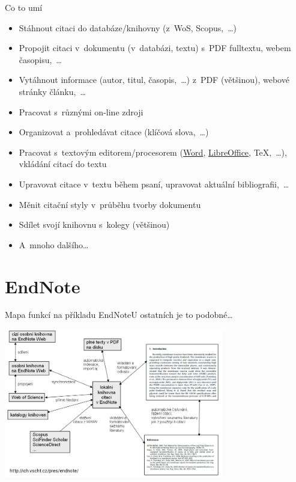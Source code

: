 \documentclass[compress, ucs, xelatex, 11pt, xcolor=svgnames, aspectratio=169,
	hyperref={
		bookmarks=true,
		unicode=true,
		colorlinks=true,
		pdftitle={Citacni software},
		plainpages=false,
		pdfauthor={Vojtech Zeisek},
		pdfsubject={Kratky uvod do citacniho software},
		pdfcreator={XeLaTeX},
		pdfkeywords={citace, reference, software, literatura},
		linkcolor=Crimson, %
		anchorcolor=Magenta, %
		citecolor=Magenta, %
		filecolor=Magenta, %
		menucolor=Magenta, %
		urlcolor=DarkTurquoise, %
		pdftex},
	url={hyphens, lowtilde} %
	]{beamer}
\begin{document}
\begin{frame}{Co to umí}
	\begin{itemize}
		\item Stáhnout citaci do databáze/knihovny (z~WoS, Scopus,~\ldots)
		\item Propojit citaci v~dokumentu (v~databázi, textu) s~PDF fulltextu, webem časopisu,~\ldots
		\item Vytáhnout informace (autor, titul, časopis,~\ldots) z~PDF (většinou), webové stránky článku,~\ldots
		\item Pracovat s~různými on-line zdroji
		\item Organizovat a~prohledávat citace (klíčová slova,~\ldots)
		\item Pracovat s~textovým editorem/procesorem (\href{https://www.natur.cuni.cz/fakulta/cit/podpora-uzivatelu/softwarove-licence}{Word}, \href{https://www.openoffice.cz/}{LibreOffice}, \TeX,~\ldots), vkládání citací do textu
		\item Upravovat citace v~textu během psaní, upravovat aktuální bibliografii,~\ldots
		\item Měnit citační styly v~průběhu tvorby dokumentu
		\item Sdílet svojí knihovnu s~kolegy (většinou)
		\item A~mnoho dalšího\ldots
	\end{itemize}
\end{frame}

\section{EndNote}

\begin{frame}{Mapa funkcí na příkladu EndNote}{U ostatních je to podobné\ldots}
	\begin{center}
		\includegraphics[height=6.5cm]{mapa_funkci.png}
	\end{center}
\end{frame}
\end{document}
